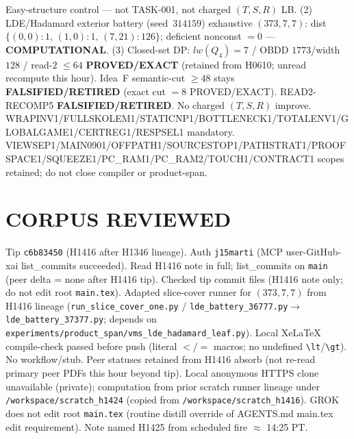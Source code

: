 \documentclass[11pt]{article}
\begin{document}
Easy-structure control --- not TASK-001, not charged $(T,S,R)$ LB.
(2) LDE/Hadamard exterior battery (seed~$314159$) exhaustive $(373,7,7)$:
dist $\{(0,0){:}1,\,(1,0){:}1,\,(7,21){:}126\}$; deficient nonconst $=0$ --- \textbf{COMPUTATIONAL}.
(3) Closed-set DP: $lw(Q_4)=7$ / OBDD $1773$/width $128$ / read-$2$ $\le64$
\textbf{PROVED/EXACT} (retained from H0610; unread recompute this hour).
Idea~F semantic-cut $\ge48$ stays \textbf{FALSIFIED/RETIRED} (exact cut $=8$ PROVED/EXACT).
READ2-RECOMP5 \textbf{FALSIFIED/RETIRED}. No charged $(T,S,R)$ improve.
WRAPINV1/FULLSKOLEM1/STATICNP1/BOTTLENECK1/TOTALENV1/GLOBALGAME1/CERTREG1/RESPSEL1 mandatory.
VIEWSEP1/MAIN0901/OFFPATH1/SOURCESTOP1/PATHSTRAT1/PROOFSPACE1/SQUEEZE1/PC\_RAM1/PC\_RAM2/TOUCH1/CONTRACT1 scopes retained; do not close compiler or product-span.

\section*{CORPUS REVIEWED}
Tip \texttt{c6b83450} (H1416 after H1346 lineage). Auth \texttt{j15marti} (MCP user-GitHub-xai list\_commits succeeded).
Read H1416 note in full; list\_commits on \texttt{main} (peer delta = none after H1416 tip).
Checked tip commit files (H1416 note only; do not edit root \texttt{main.tex}).
Adapted slice-cover runner for $(373,7,7)$ from H1416 lineage
(\texttt{run\_slice\_cover\_one.py} / \texttt{lde\_battery\_36777.py}$\to$\texttt{lde\_battery\_37377.py};
depends on \texttt{experiments/product\_span/vms\_lde\_hadamard\_leaf.py}).
Local XeLaTeX compile-check passed before push (literal $<$/$=$ macros; no undefined \texttt{\textbackslash lt}/\texttt{\textbackslash gt}).
No workflow/stub. Peer statuses retained from H1416 absorb (not re-read primary peer PDFs this hour beyond tip).
Local anonymous HTTPS clone unavailable (private);
computation from prior scratch runner lineage under \texttt{/workspace/scratch\_h1424}
(copied from \texttt{/workspace/scratch\_h1416}).
GROK does not edit root \texttt{main.tex} (routine distill override of AGENTS.md main.tex edit requirement).
Note named H1425 from scheduled fire $\approx$ 14:25 PT.
\end{document}
